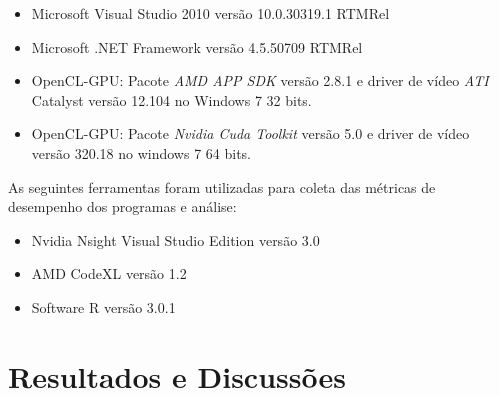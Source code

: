 \begin{itemize}
\item Microsoft Visual Studio 2010 versão 10.0.30319.1 RTMRel\\
\item Microsoft .NET Framework versão 4.5.50709 RTMRel\\
\item OpenCL-GPU: Pacote \textit{AMD APP SDK} versão 2.8.1 e driver de vídeo \textit{ATI} Catalyst versão 12.104 no Windows 7 32 bits.\\
\item OpenCL-GPU: Pacote \textit{Nvidia Cuda Toolkit} versão 5.0 e driver de vídeo versão 320.18 no windows 7 64 bits.\\
\end{itemize}
As seguintes ferramentas foram utilizadas para coleta das métricas de desempenho dos programas e análise:
\begin{itemize}
\item Nvidia Nsight Visual Studio Edition versão 3.0
\item AMD CodeXL versão 1.2
\item Software R versão 3.0.1
\end{itemize}

\section{Resultados e Discussões}
\FloatBarrier
